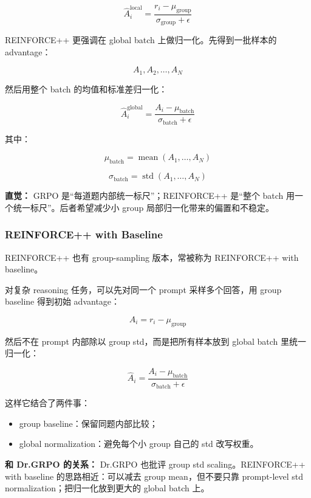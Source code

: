 \[
\hat{A}_i^\text{local}
=
\frac{r_i-\mu_\text{group}}{\sigma_\text{group}+\epsilon}
\]

REINFORCE++ 更强调在 global batch 上做归一化。先得到一批样本的 advantage：

\[
A_1,A_2,\ldots,A_N
\]

然后用整个 batch 的均值和标准差归一化：

\[
\hat{A}_i^\text{global}
=
\frac{
A_i-\mu_\text{batch}
}{
\sigma_\text{batch}+\epsilon
}
\]

其中：

\[
\mu_\text{batch}
=
\operatorname{mean}(A_1,\ldots,A_N)
\]

\[
\sigma_\text{batch}
=
\operatorname{std}(A_1,\ldots,A_N)
\]

\begin{intubox}
\textbf{直觉：} GRPO 是“每道题内部统一标尺”；REINFORCE++ 是“整个 batch 用一个统一标尺”。后者希望减少小 group 局部归一化带来的偏置和不稳定。
\end{intubox}

\subsubsection{REINFORCE++ with Baseline}

REINFORCE++ 也有 group-sampling 版本，常被称为 REINFORCE++ with baseline。

对复杂 reasoning 任务，可以先对同一个 prompt 采样多个回答，用 group baseline 得到初始 advantage：

\[
A_i
=
r_i-\mu_\text{group}
\]

然后不在 prompt 内部除以 group std，而是把所有样本放到 global batch 里统一归一化：

\[
\hat{A}_i
=
\frac{
A_i-\mu_\text{batch}
}{
\sigma_\text{batch}+\epsilon
}
\]

这样它结合了两件事：

\begin{itemize}[leftmargin=1.5em]
  \item group baseline：保留同题内部比较；
  \item global normalization：避免每个小 group 自己的 std 改写权重。
\end{itemize}

\begin{summarybox}
\textbf{和 Dr.GRPO 的关系：} Dr.GRPO 也批评 group std scaling。REINFORCE++ with baseline 的思路相近：可以减去 group mean，但不要只靠 prompt-level std normalization；把归一化放到更大的 global batch 上。
\end{summarybox}

